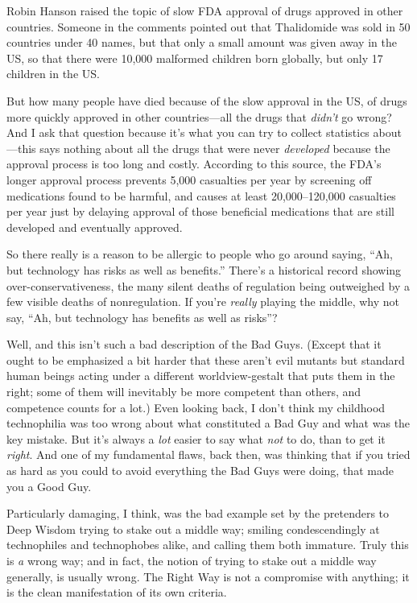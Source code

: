 {
 Robin Hanson raised the topic of slow FDA approval of drugs
approved in other countries. Someone in the comments pointed out that
Thalidomide was sold in 50 countries under 40 names, but that only a
small amount was given away in the US, so that there were 10,000
malformed children born globally, but only 17 children in the US.}

{
 But how many people have died because of the slow approval in the
US, of drugs more quickly approved in other countries---all the drugs
that \textit{didn't} go wrong? And I ask that question
because it's what you can try to collect statistics
about---this says nothing about all the drugs that were never
\textit{developed} because the approval process is too long and costly.
According to this source, the FDA's longer approval
process prevents 5,000 casualties per year by screening off medications
found to be harmful, and causes at least 20,000--120,000 casualties per
year just by delaying approval of those beneficial medications that are
still developed and eventually approved.}

{
 So there really is a reason to be allergic to people who go around
saying, ``Ah, but technology has risks as well as
benefits.'' There's a historical
record showing over-conservativeness, the many silent deaths of
regulation being outweighed by a few visible deaths of nonregulation.
If you're \textit{really} playing the middle, why not
say, ``Ah, but technology has benefits as well as
risks''?}

{
 Well, and this isn't such a bad description of the
Bad Guys. (Except that it ought to be emphasized a bit harder that
these aren't evil mutants but standard human beings
acting under a different worldview-gestalt that puts them in the right;
some of them will inevitably be more competent than others, and
competence counts for a lot.) Even looking back, I
don't think my childhood technophilia was too wrong
about what constituted a Bad Guy and what was the key mistake. But
it's always a \textit{lot} easier to say what
\textit{not} to do, than to get it \textit{right}. And one of my
fundamental flaws, back then, was thinking that if you tried as hard as
you could to avoid everything the Bad Guys were doing, that made you a
Good Guy.}

{
 Particularly damaging, I think, was the bad example set by the
pretenders to Deep Wisdom trying to stake out a middle way; smiling
condescendingly at technophiles and technophobes alike, and calling
them both immature. Truly this is \textit{a} wrong way; and in fact,
the notion of trying to stake out a middle way generally, is usually
wrong. The Right Way is not a compromise with anything; it is the clean
manifestation of its own criteria.}

